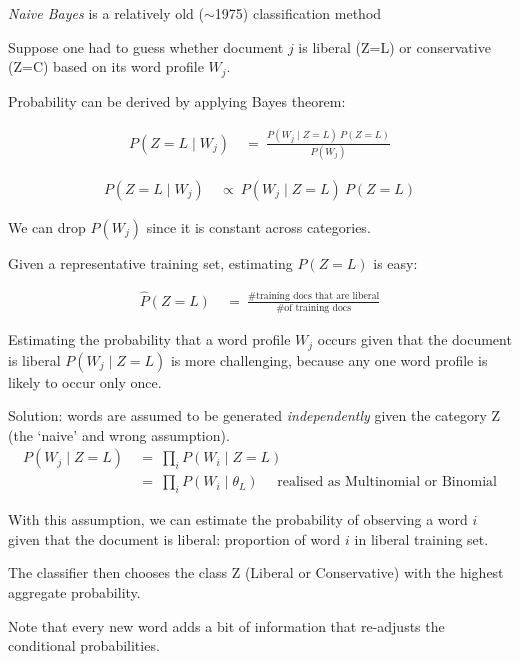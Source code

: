 \documentclass[kp]{foilpack}
\begin{document}

\textsl{Naive Bayes} is a relatively old ($\sim$1975)  classification method

Suppose one had to guess  whether document $j$ is liberal (Z=L) or conservative (Z=C) based on its word profile $W_j$.

Probability can be derived by applying Bayes theorem:

\begin{align*}
P(Z=L \mid W_j) &~=~ \frac{P(W_j \mid Z=L)~P(Z=L)}{P(W_j)}
\end{align*}


\begin{align*}
P(Z=L \mid W_j) &~\propto~ P(W_j \mid Z=L)~P(Z=L)
\end{align*}

We can drop $P(W_j)$ since it is constant across categories. 

Given a representative training set, estimating $P(Z=L)$ is easy: 

\begin{align*}
\hat{P}(Z=L)&~=~ \frac{\text{\# training docs that are liberal}}
{\text{\# of training docs}}
\end{align*}


Estimating the probability that a word profile $W_j$ occurs given that the document is liberal $P(W_j\mid Z=L)$ is more challenging, because any one word profile is likely to occur only once.

Solution: words are assumed to be generated \textit{independently} given the category Z (the `naive' and wrong assumption). 
\begin{align*}
P(W_j \mid Z=L) &~=~ \prod_i P(W_i \mid Z=L)\\
                        &~=~ \prod_i P(W_i \mid \theta_L) ~~~~~~\text{realised as Multinomial or Binomial}
\end{align*}
\newpage


With this assumption, we can estimate the probability of observing a word $i$  given that the document is liberal: proportion of word $i$ in liberal training set.

The classifier then  chooses the class Z (Liberal or Conservative) with the highest aggregate probability.

Note that every new word adds a bit of information that re-adjusts the conditional probabilities.
\end{document}
